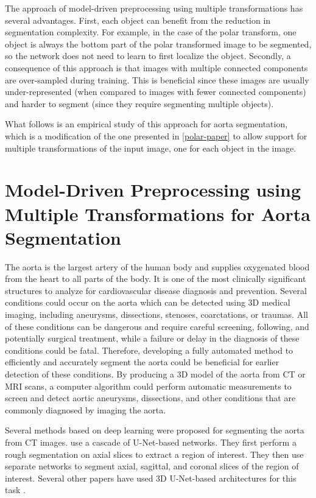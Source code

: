 The approach of model-driven preprocessing using multiple transformations has several advantages. First, each object can benefit from the reduction in segmentation complexity. For example, in the case of the polar transform, one object is always the bottom part of the polar transformed image to be segmented, so the network does not need to learn to first localize the object. Secondly, a consequence of this approach is that images with multiple connected components are over-sampled during training. This is beneficial since these images are usually under-represented (when compared to images with fewer connected components) and harder to segment (since they require segmenting multiple objects).
	
What follows is an empirical study of this approach for aorta segmentation, which is a modification of the one presented in \ref{polar-paper} to allow support for multiple transformations of the input image, one for each object in the image.

\section{Model-Driven Preprocessing using Multiple Transformations for Aorta Segmentation}

The aorta is the largest artery of the human body and supplies oxygenated blood from the heart to all parts of the body. It is one of the most clinically significant structures to analyze for cardiovascular disease diagnosis and prevention. Several conditions could occur on the aorta which can be detected using 3D medical imaging, including aneurysms, dissections, stenoses, coarctations, or traumas. All of these conditions can be dangerous and require careful screening, following, and potentially surgical treatment, while a failure or delay in the diagnosis of these conditions could be fatal. Therefore, developing a fully automated method to efficiently and accurately segment the aorta could be beneficial for earlier detection of these conditions. By producing a 3D model of the aorta from CT or MRI scans, a computer algorithm could perform automatic measurements to screen and detect aortic aneurysms, dissections, and other conditions that are commonly diagnosed by imaging the aorta.

Several methods based on deep learning were proposed for segmenting the aorta from CT images. \citet{fantazzini3DAutomaticSegmentation2020} use a cascade of U-Net-based networks. They first perform a rough segmentation on axial slices to extract a region of interest. They then use separate networks to segment axial, sagittal, and coronal slices of the region of interest. Several other papers have used 3D U-Net-based architectures for this task \cite{yuThreeDimensionalDeepConvolutional2021, chenMultistageLearningSegmentation2021}.

